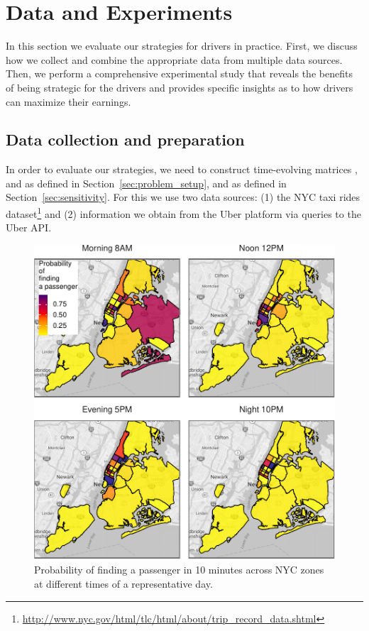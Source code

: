 
\section{Data and Experiments}
\label{sec:experiments}
In this section we  evaluate our strategies for drivers 
in practice. First, we discuss how we collect and combine the appropriate data 
from multiple data sources. Then, we perform a comprehensive experimental study
that reveals the benefits of being strategic for the drivers and provides
specific insights as to how drivers can maximize their earnings.

\subsection{Data collection and preparation}
In order to evaluate our strategies, we need to construct 
time-evolving matrices 
{\empiricaltransitionmatrix}, {\traveltimematrix} and {\rewardsmatrix} as defined in Section~\ref{sec:problem_setup},
and {\countmatrix} as defined in Section~\ref{sec:sensitivity}.
For this we use two data sources: (1) the NYC taxi rides 
dataset\footnote{\url{http://www.nyc.gov/html/tlc/html/about/trip_record_data.shtml}} and
(2) information we obtain from the Uber platform via queries to the Uber API.

\begin{figure}
	\centering
	\includegraphics{figures/successful_heatmap.pdf}
	\caption{Probability of finding a passenger in 10 minutes across NYC zones at different times of a representative day.}
	\label{fig:successful_heatmap}
\end{figure}


